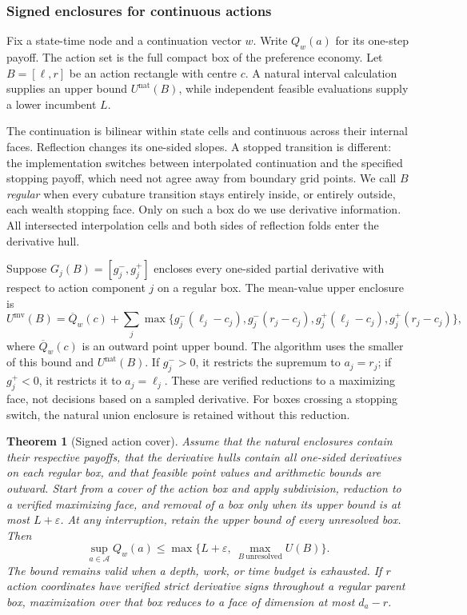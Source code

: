 \documentclass[ecta,nameyear,draft]{econsocart}
\newtheorem{theorem}{Theorem}
\theoremstyle{definition}
\theoremstyle{remark}
\newcommand{\Act}{\mathcal A}
\begin{document}
\subsubsection{Signed enclosures for continuous actions}
Fix a state-time node and a continuation vector $w$. Write $Q_w(a)$ for its one-step payoff. The action set is the full compact box of the preference economy. Let $B=[\ell,r]$ be an action rectangle with centre $c$. A natural interval calculation supplies an upper bound $U^{\mathrm{nat}}(B)$, while independent feasible evaluations supply a lower incumbent $L$.

The continuation is bilinear within state cells and continuous across their internal faces. Reflection changes its one-sided slopes. A stopped transition is different: the implementation switches between interpolated continuation and the specified stopping payoff, which need not agree away from boundary grid points. We call $B$ \emph{regular} when every cubature transition stays entirely inside, or entirely outside, each wealth stopping face. Only on such a box do we use derivative information. All intersected interpolation cells and both sides of reflection folds enter the derivative hull.

Suppose $G_j(B)=[g_j^-,g_j^+]$ encloses every one-sided partial derivative with respect to action component $j$ on a regular box. The mean-value upper enclosure is
\begin{equation}\label{eq:r9mean}
 U^{\mathrm{mv}}(B)=\overline Q_w(c)+
 \sum_j\max\{g_j^-(\ell_j-c_j),g_j^-(r_j-c_j),g_j^+(\ell_j-c_j),g_j^+(r_j-c_j)\},
\end{equation}
where $\overline Q_w(c)$ is an outward point upper bound. The algorithm uses the smaller of this bound and $U^{\mathrm{nat}}(B)$. If $g_j^->0$, it restricts the supremum to $a_j=r_j$; if $g_j^+<0$, it restricts it to $a_j=\ell_j$. These are verified reductions to a maximizing face, not decisions based on a sampled derivative. For boxes crossing a stopping switch, the natural union enclosure is retained without this reduction.

\begin{theorem}[Signed action cover]\label{thm:r9cover}
Assume that the natural enclosures contain their respective payoffs, that the derivative hulls contain all one-sided derivatives on each regular box, and that feasible point values and arithmetic bounds are outward. Start from a cover of the action box and apply subdivision, reduction to a verified maximizing face, and removal of a box only when its upper bound is at most $L+\varepsilon$. At any interruption, retain the upper bound of every unresolved box. Then
\begin{equation}\label{eq:r9coverbound}
 \sup_{a\in\Act}Q_w(a)\leq\max\{L+\varepsilon,\ \max_{B\ \mathrm{unresolved}}U(B)\}.
\end{equation}
The bound remains valid when a depth, work, or time budget is exhausted. If $r$ action coordinates have verified strict derivative signs throughout a regular parent box, maximization over that box reduces to a face of dimension at most $d_a-r$.
\end{theorem}
\end{document}
